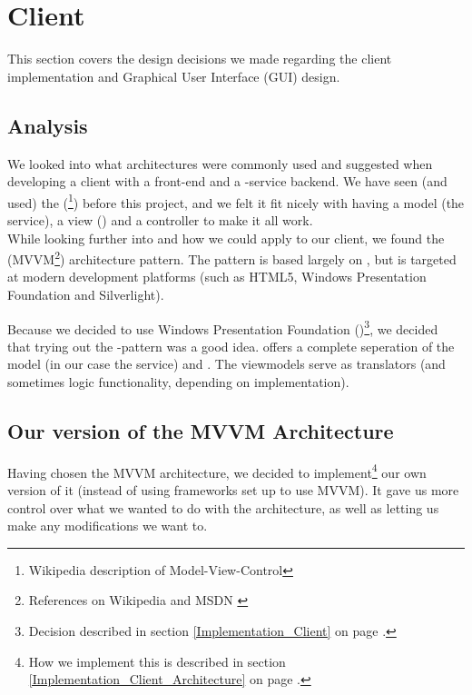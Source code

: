 \section{Client}
\label{Design_Client}
This section covers the design decisions we made regarding the client implementation and Graphical User Interface (GUI) design.
\subsection{Analysis}
\label{Design_Client_Analysis}
We looked into what architectures were commonly used and suggested when developing a client with a  front-end and a -service backend. We have seen (and used) the  (\footnote{Wikipedia description of Model-View-Control\cite{WIKI-MVC}}) before this project, and we felt it fit nicely with having a model (the service), a view () and a controller to make it all work. 
\\While looking further into  and how we could apply to our client, we found the  (MVVM\footnote{References on Wikipedia \cite{WIKI-MVVM} and MSDN \cite{MSDN-WPF-MVVM}}) architecture pattern. The  pattern is based largely on , but is targeted at modern  development platforms (such as HTML5, Windows Presentation Foundation and Silverlight).

Because we decided to use Windows Presentation Foundation ()\footnote{Decision described in section \ref{Implementation_Client} on page \pageref{Implementation_Client}.}, we decided that trying out the -pattern was a good idea.  offers a complete seperation of the model (in our case the  service) and . The viewmodels serve as translators (and sometimes logic functionality, depending on implementation).
\subsection[Architecture]{Our version of the MVVM Architecture}
\label{Design_Client_Architecture}
Having chosen the MVVM architecture, we decided to implement\footnote{How we implement this is described in section \ref{Implementation_Client_Architecture} on page \pageref{Implementation_Client_Architecture}.} our own version of it (instead of using frameworks set up to use MVVM). It gave us more control over what we wanted to do with the architecture, as well as letting us make any modifications we want to.

